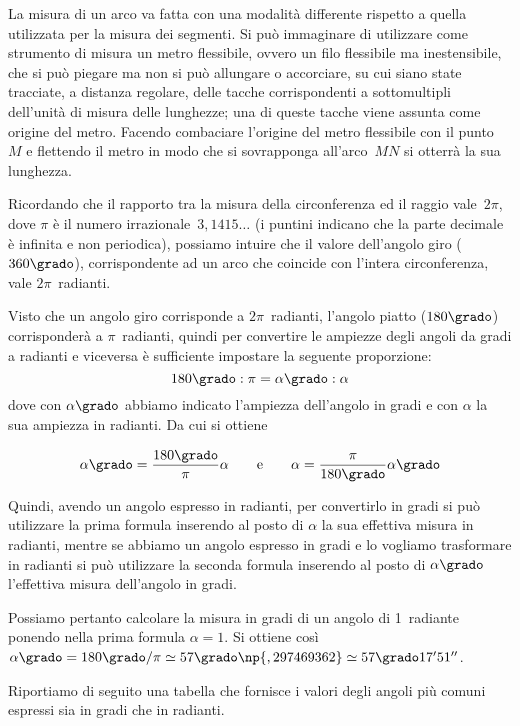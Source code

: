 \begin{osservazione}
La misura di un arco va fatta con una modalità differente rispetto a 
quella utilizzata per la misura dei segmenti. Si può immaginare di 
utilizzare come strumento di misura un metro flessibile, ovvero un 
filo flessibile ma inestensibile, che si può piegare ma non si può 
allungare o accorciare, su cui siano state tracciate, a distanza 
regolare, delle tacche corrispondenti a sottomultipli dell'unità di 
misura delle lunghezze; una di queste tacche viene assunta come 
origine del metro. Facendo combaciare l'origine del metro flessibile 
con il punto~\(M\) e flettendo il metro in modo che si sovrapponga 
all'arco~\(MN\) si otterrà la sua lunghezza.
\end{osservazione}

Ricordando che il rapporto tra la misura della circonferenza ed il 
raggio vale~\(2\pi\), dove \(\pi\) è il numero 
irrazionale~\(3,1415\ldots{}\) (i puntini indicano che la parte 
decimale è infinita e non periodica), possiamo intuire che il valore 
dell'angolo giro (\(360\grado\)), corrispondente ad un arco che 
coincide con l'intera circonferenza, vale \(2\pi\)~radianti.

Visto che un angolo giro corrisponde a \(2\pi\)~radianti, l'angolo 
piatto (\(180\grado\)) corrisponderà a \(\pi\)~radianti, quindi per 
convertire le ampiezze degli angoli da gradi a radianti e viceversa è 
sufficiente impostare la seguente proporzione:
\[180\grado : \pi = \alpha\grado : \alpha\]
dove con \(\alpha\grado\) abbiamo indicato l'ampiezza dell'angolo in 
gradi e con \(\alpha\) la sua ampiezza in radianti. Da cui si ottiene

\[\alpha\grado = 
\dfrac{180\grado}{\pi}\alpha\qquad\text{e}\qquad\alpha = 
\dfrac{\pi}{180\grado}\alpha\grado\]

Quindi, avendo un angolo espresso in radianti, per convertirlo in 
gradi si può utilizzare la prima formula inserendo al posto di 
\(\alpha\) la sua effettiva misura in radianti, mentre se abbiamo un 
angolo espresso in gradi e lo vogliamo trasformare in radianti si può 
utilizzare la seconda formula inserendo al posto di \(\alpha\grado\) 
l'effettiva misura dell'angolo in gradi.

Possiamo pertanto calcolare la misura in gradi di un angolo di 
1~radiante ponendo nella prima formula \(\alpha=1\). Si ottiene così 
\(\alpha\grado = 180\grado/\pi \simeq 57\grado\np{,297469362} \simeq 
57\grado 17'51''\).

Riportiamo di seguito una tabella che fornisce i valori degli angoli 
più comuni espressi sia in gradi che in radianti.


